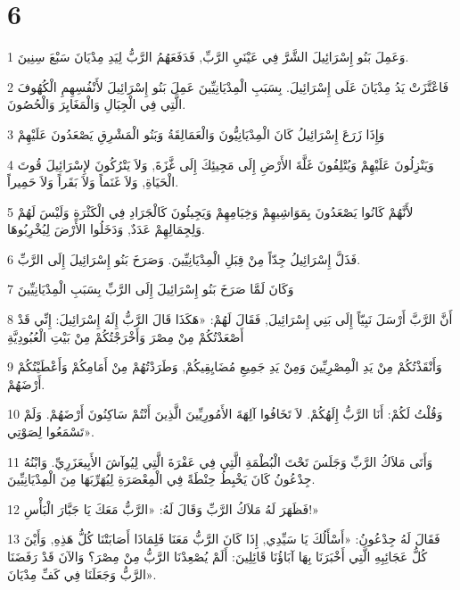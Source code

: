 \chapter{6}

\par 1 وَعَمِلَ بَنُو إِسْرَائِيلَ الشَّرَّ فِي عَيْنَيِ الرَّبِّ, فَدَفَعَهُمُ الرَّبُّ لِيَدِ مِدْيَانَ سَبْعَ سِنِينَ.
\par 2 فَاعْتَّزَتْ يَدُ مِدْيَانَ عَلَى إِسْرَائِيلَ. بِسَبَبِ الْمِدْيَانِيِّينَ عَمِلَ بَنُو إِسْرَائِيلَ لأَنْفُسِهِمِ الْكُهُوفَ الَّتِي فِي الْجِبَالِ وَالْمَغَايِرَ وَالْحُصُونَ.
\par 3 وَإِذَا زَرَعَ إِسْرَائِيلُ كَانَ الْمِدْيَانِيُّونَ وَالْعَمَالِقَةُ وَبَنُو الْمَشْرِقِ يَصْعَدُونَ عَلَيْهِمْ
\par 4 وَيَنْزِلُونَ عَلَيْهِمْ وَيُتْلِفُونَ غَلَّةَ الأَرْضِ إِلَى مَجِيئِكَ إِلَى غَّزَةَ, وَلاَ يَتْرُكُونَ لإِسْرَائِيلَ قُوتَ الْحَيَاةِ, وَلاَ غَنَماً وَلاَ بَقَراً وَلاَ حَمِيراً.
\par 5 لأَنَّهُمْ كَانُوا يَصْعَدُونَ بِمَوَاشِيهِمْ وَخِيَامِهِمْ وَيَجِيئُونَ كَالْجَرَادِ فِي الْكَثْرَةِ وَلَيْسَ لَهُمْ وَلِجِمَالِهِمْ عَدَدٌ, وَدَخَلُوا الأَرْضَ لِيُخْرِبُوهَا.
\par 6 فَذَلَّ إِسْرَائِيلُ جِدّاً مِنْ قِبَلِ الْمِدْيَانِيِّينَ. وَصَرَخَ بَنُو إِسْرَائِيلَ إِلَى الرَّبِّ.
\par 7 وَكَانَ لَمَّا صَرَخَ بَنُو إِسْرَائِيلَ إِلَى الرَّبِّ بِسَبَبِ الْمِدْيَانِيِّينَ
\par 8 أَنَّ الرَّبَّ أَرْسَلَ نَبِيّاً إِلَى بَنِي إِسْرَائِيلَ, فَقَالَ لَهُمْ: «هَكَذَا قَالَ الرَّبُّ إِلَهُ إِسْرَائِيلَ: إِنِّي قَدْ أَصْعَدْتُكُمْ مِنْ مِصْرَ وَأَخْرَجْتُكُمْ مِنْ بَيْتِ الْعُبُودِيَّةِ
\par 9 وَأَنْقَذْتُكُمْ مِنْ يَدِ الْمِصْرِيِّينَ وَمِنْ يَدِ جَمِيعِ مُضَايِقِيكُمْ, وَطَرَدْتُهُمْ مِنْ أَمَامِكُمْ وَأَعْطَيْتُكُمْ أَرْضَهُمْ.
\par 10 وَقُلْتُ لَكُمْ: أَنَا الرَّبُّ إِلَهُكُمْ. لاَ تَخَافُوا آلِهَةَ الأَمُورِيِّينَ الَّذِينَ أَنْتُمْ سَاكِنُونَ أَرْضَهُمْ. وَلَمْ تَسْمَعُوا لِصَوْتِي».
\par 11 وَأَتَى مَلاَكُ الرَّبِّ وَجَلَسَ تَحْتَ الْبُطْمَةِ الَّتِي فِي عَفْرَةَ الَّتِي لِيُوآشَ الأَبِيعَزَرِيِّ. وَابْنُهُ جِدْعُونُ كَانَ يَخْبِطُ حِنْطَةً فِي الْمِعْصَرَةِ لِيُهَرِّبَهَا مِنَ الْمِدْيَانِيِّينَ.
\par 12 فَظَهَرَ لَهُ مَلاَكُ الرَّبِّ وَقَالَ لَهُ: «الرَّبُّ مَعَكَ يَا جَبَّارَ الْبَأْسِ!»
\par 13 فَقَالَ لَهُ جِدْعُونُ: «أَسْأَلُكَ يَا سَيِّدِي, إِذَا كَانَ الرَّبُّ مَعَنَا فَلِمَاذَا أَصَابَتْنَا كُلُّ هَذِهِ, وَأَيْنَ كُلُّ عَجَائِبِهِ الَّتِي أَخْبَرَنَا بِهَا آبَاؤُنَا قَائِلِينَ: أَلَمْ يُصْعِدْنَا الرَّبُّ مِنْ مِصْرَ؟ وَالآنَ قَدْ رَفَضَنَا الرَّبُّ وَجَعَلَنَا فِي كَفِّ مِدْيَانَ».
